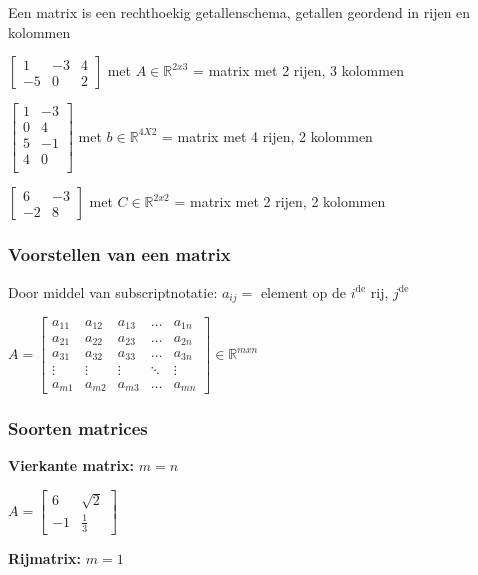\documentclass{article}
\begin{document}
Een matrix is een rechthoekig getallenschema, getallen geordend in rijen en kolommen

$\begin{bmatrix}
1 & -3 & 4\\
-5 & 0 & 2
\end{bmatrix}$ met $A \in \mathbb{R}^{2x3}$ = matrix met 2 rijen, 3 kolommen

$\begin{bmatrix}
1 & -3\\
0 & 4\\
5 & -1\\
4 & 0\\
\end{bmatrix}$ met $b \in \mathbb{R}^{4X2}$ = matrix met 4 rijen, 2 kolommen

$\begin{bmatrix}
6 & -3\\
-2 & 8
\end{bmatrix}$ met $C \in \mathbb{R}^{2x2}$ = matrix met 2 rijen, 2 kolommen

\subsubsection{Voorstellen van een matrix}

Door middel van subscriptnotatie: $a_{ij} =$ element op de $i^\text{de}$ rij, $j^\text{de}$

$A = \begin{bmatrix}
a_{11} & a_{12} & a_{13} & \dots & a_{1n}\\
a_{21} & a_{22} & a_{23} & \dots & a_{2n}\\
a_{31} & a_{32} & a_{33} & \dots & a_{3n}\\
\vdots & \vdots & \vdots & \ddots & \vdots\\
a_{m1} & a_{m2} & a_{m3} & \dots & a_{mn}
\end{bmatrix} \in \mathbb{R}^{mxn}$

\subsubsection{Soorten matrices}

\textbf{Vierkante matrix:} $m = n$

$A = \begin{bmatrix}
6 & \sqrt{2}\\
-1 & \frac13
\end{bmatrix}$

\textbf{Rijmatrix:} $m = 1$
\end{document}
